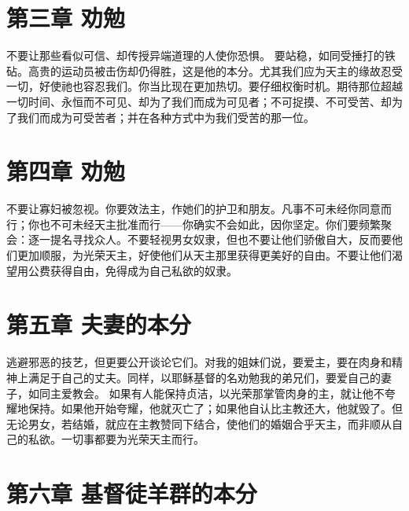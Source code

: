 
\section{第三章 劝勉}

不要让那些看似可信、却传授异端道理的人使你恐惧。 要站稳，如同受捶打的铁砧。高贵的运动员被击伤却仍得胜，这是他的本分。尤其我们应为天主的缘故忍受一切，好使祂也容忍我们。你当比现在更加热切。要仔细权衡时机。期待那位超越一切时间、永恒而不可见、却为了我们而成为可见者；不可捉摸、不可受苦、却为了我们而成为可受苦者；并在各种方式中为我们受苦的那一位。\par


\section{第四章 劝勉}

不要让寡妇被忽视。你要效法主，作她们的护卫和朋友。凡事不可未经你同意而行；你也不可未经天主批准而行——你确实不会如此，因你坚定。你们要频繁聚会：逐一提名寻找众人。不要轻视男女奴隶，但也不要让他们骄傲自大，反而要他们更加顺服，为光荣天主，好使他们从天主那里获得更美好的自由。不要让他们渴望用公费获得自由，免得成为自己私欲的奴隶。\par


\section{第五章 夫妻的本分}

逃避邪恶的技艺，但更要公开谈论它们。对我的姐妹们说，要爱主，要在肉身和精神上满足于自己的丈夫。同样，以耶稣基督的名劝勉我的弟兄们，要爱自己的妻子，如同主爱教会。 如果有人能保持贞洁，以光荣那掌管肉身的主，就让他不夸耀地保持。如果他开始夸耀，他就灭亡了；如果他自认比主教还大，他就毁了。但无论男女，若结婚，就应在主教赞同下结合，使他们的婚姻合乎天主，而非顺从自己的私欲。一切事都要为光荣天主而行。\par


\section{第六章 基督徒羊群的本分}

